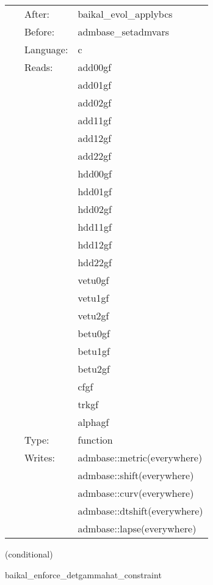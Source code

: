  \begin{tabular*}{160mm}{cll} 
~ & After:  & baikal\_evol\_applybcs \\ 
~ & Before:  & admbase\_setadmvars \\ 
~ & Language:  & c \\ 
~ & Reads:  & add00gf \\ 
~& ~ &add01gf\\ 
~& ~ &add02gf\\ 
~& ~ &add11gf\\ 
~& ~ &add12gf\\ 
~& ~ &add22gf\\ 
~& ~ &hdd00gf\\ 
~& ~ &hdd01gf\\ 
~& ~ &hdd02gf\\ 
~& ~ &hdd11gf\\ 
~& ~ &hdd12gf\\ 
~& ~ &hdd22gf\\ 
~& ~ &vetu0gf\\ 
~& ~ &vetu1gf\\ 
~& ~ &vetu2gf\\ 
~& ~ &betu0gf\\ 
~& ~ &betu1gf\\ 
~& ~ &betu2gf\\ 
~& ~ &cfgf\\ 
~& ~ &trkgf\\ 
~& ~ &alphagf\\ 
~ & Type:  & function \\ 
~ & Writes:  & admbase::metric(everywhere) \\ 
~& ~ &admbase::shift(everywhere)\\ 
~& ~ &admbase::curv(everywhere)\\ 
~& ~ &admbase::dtshift(everywhere)\\ 
~& ~ &admbase::lapse(everywhere)\\ 
\end{tabular*} 


\vspace{5mm}

   (conditional) 

\hspace{5mm} baikal\_enforce\_detgammahat\_constraint 

\hspace{5mm}{\it enforce detgammabar = detgammahat (= 1 in cartesian) } 


\hspace{5mm}

